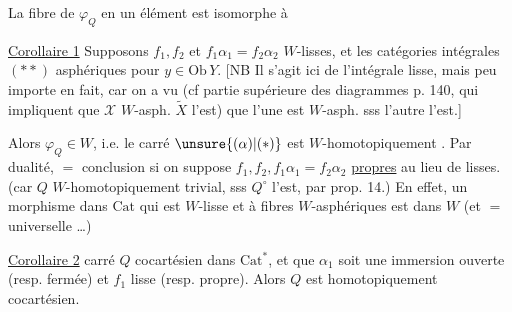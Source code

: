 

La fibre de $\varphi_Q$ en un  élément  est isomorphe à


\uline{Corollaire 1} Supposons $f_1,f_2$ et $f_1\alpha_1=f_2\alpha_2$ $W$-lisses, et les catégories intégrales $(**)$  asphériques pour  $y\in\mathrm{Ob}\,Y$. [NB Il s'agit ici de l'intégrale lisse, mais peu importe en fait, car on a vu  (cf   partie supérieure des diagrammes p. 140, qui impliquent que $\mathscr X$ $W$-asph.  $\widetilde X$ l'est) que l'une est $W$-asph. sss l'autre l'est.]


Alors $\varphi_Q\in W$, i.e. le carré $\unsure{(\alpha)|(*)}$ est $W$-homotopiquement . Par dualité, $=$ conclusion si on suppose $f_1,f_2,f_1\alpha_1=f_2\alpha_2$ \uline{propres} au lieu de lisses. (car $Q$ $W$-homotopiquement trivial, sss $Q^\circ$ l'est, par prop. 14.)
En effet, un morphisme dans $\mathrm{Cat}$ qui est $W$-lisse et à fibres $W$-asphériques est dans $W$ (et $=$  universelle \ldots)

\uline{Corollaire 2}   carré $Q$ cocartésien dans $\mathrm{Cat}$${}^{*}$, et que $\alpha_1$ soit une immersion ouverte (resp. fermée) et $f_1$ lisse (resp. propre). Alors $Q$ est homotopiquement cocartésien.

